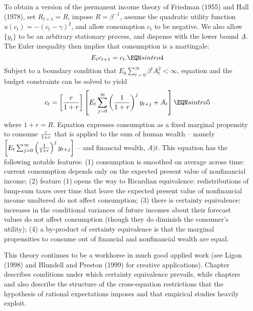   To obtain a version of the permanent income theory  of
Friedman (1955) and Hall (1978), set $R_{t+1} =R$, impose
$R=\beta^{-1}$, assume the quadratic utility function
$u(c_t)=-(c_t-\gamma)^2$, and allow consumption $c_t$ to
be negative. We also allow
$\{y_t\}$ to be an arbitrary  stationary
process, and dispense with the lower bound $\underline A$.
 The Euler inequality  then implies that consumption is
a martingale:
$$ E_t c_{t+1} = c_t.  \EQN sintro4 $$
Subject to a boundary condition  that
 $E_0 \sum_{t=0}^\infty \beta^t A_t^2 <\infty$,
equation  and  the budget constraints  can be solved
to yield
$$ c_t = \left[{r \over 1+r}\right]
\left[E_t \sum_{j=0}^\infty
 \left({1 \over 1+r}\right)^j y_{t+j} + A_t \right]
\EQN sintro5 $$
where $1+r = R$.  Equation 
expresses consumption as a fixed marginal propensity to consume
${r \over 1+r}$ that is applied to the sum of human wealth -- namely
$\left[E_t \sum_{j=0}^\infty
 \left({1 \over 1+r}\right)^j y_{t+j}\right] $ -- and
 financial wealth, $A)t$.
This equation has the following notable features:
(1) consumption is smoothed on average across time: current
consumption depends only on the expected present value of nonfinancial
income;
(2)  feature (1) opens the way to Ricardian equivalence: redistributions
of lump-sum taxes over time that leave  the expected present value of
nonfinancial income unaltered do not affect consumption;
(3) there is certainty equivalence: increases in the conditional variances
of future incomes about  their forecast values do not affect consumption
(though they do diminish the consumer's utility);
(4) a by-product of certainty equivalence is that   the marginal propensities
to consume out of financial and nonfinancial wealth are equal.


 
%
This theory continues to be a workhorse in much
good applied  work (see Ligon (1998)
and  Blundell and
Preston (1999) for creative applications).
Chapter  describes  conditions under which
certainty equivalence prevails, while chapters  and 
  also describe the structure of the cross-equation
restrictions   that the hypothesis of rational expectations imposes and that
 empirical studies
heavily exploit.







